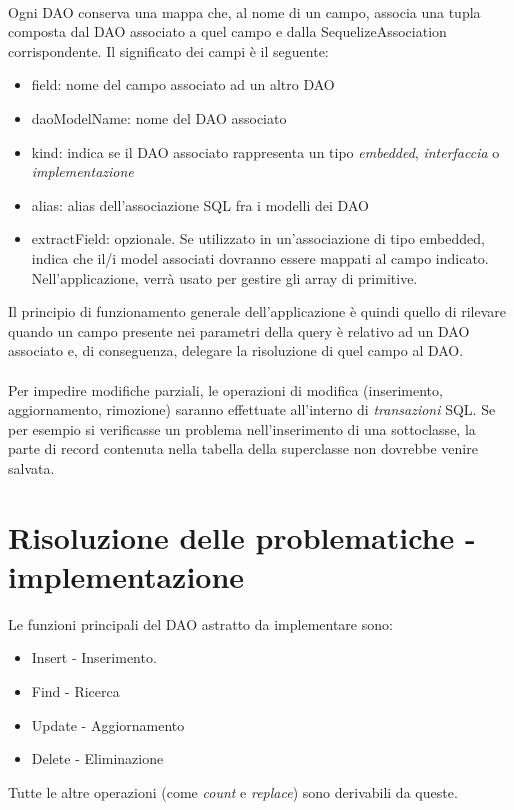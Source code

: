 \documentclass[a4paper, 12pt]{report}
\begin{document}
      \paragraph*{}
      Ogni DAO conserva una mappa che, al nome di un campo, associa una tupla composta dal DAO associato a quel campo e dalla SequelizeAssociation corrispondente.
      Il significato dei campi è il seguente:
      \begin{itemize}
        \item field: nome del campo associato ad un altro DAO
        \item daoModelName: nome del DAO associato
        \item kind: indica se il DAO associato rappresenta un tipo \emph{embedded}, \emph{interfaccia} o \emph{implementazione}
        \item alias: alias dell'associazione SQL fra i modelli dei DAO
        \item extractField: opzionale. Se utilizzato in un'associazione di tipo embedded, indica che il/i model associati dovranno essere mappati al campo indicato.
                            Nell'applicazione, verrà usato per gestire gli array di primitive.
      \end{itemize}
      Il principio di funzionamento generale dell'applicazione è quindi quello di rilevare quando un campo presente nei parametri della query è relativo ad un DAO associato e, di conseguenza, delegare la risoluzione di quel campo al DAO.
      \paragraph*{}
      Per impedire modifiche parziali, le operazioni di modifica (inserimento, aggiornamento, rimozione) saranno effettuate all'interno di \emph{transazioni} SQL.
      Se per esempio si verificasse un problema nell'inserimento di una sottoclasse, la parte di record contenuta nella tabella della superclasse non dovrebbe venire salvata.
    \newpage
    \section{Risoluzione delle problematiche - implementazione}
      Le funzioni principali del DAO astratto da implementare sono:
      \begin{itemize}
        \item Insert - Inserimento.
        \item Find   - Ricerca
        \item Update - Aggiornamento
        \item Delete - Eliminazione
      \end{itemize}
      Tutte le altre operazioni (come \emph{count} e \emph{replace}) sono derivabili da queste.
\end{document}
